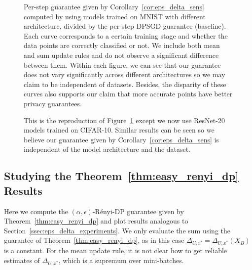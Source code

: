 \begin{figure}[t]
\centering
{}
\caption{Per-step guarantee given by Corollary~\ref{cor:eps_delta_sens} computed by using models trained on MNIST with different architecture, divided by the per-step DPSGD guarantee (baseline). Each curve corresponds to a certain training stage and whether the data points are correctly classified or not. We include both mean and sum update rules and do not observe a significant difference between them. Within each figure, we can see that our guarantee does not vary significantly across different architectures so we may claim to be independent of datasets. Besides, the disparity of these curves also supports our claim that more accurate points have better privacy guarantees.
}
\label{fig:ed_eps_curve_vary_arch_mnist}
\end{figure}


\begin{figure}[t]
\centering
{}
\caption{This is the reproduction of Figure~\ref{fig:ed_eps_curve_vary_arch_mnist} except we now use ResNet-20 models trained on CIFAR-10. Similar results can be seen so we believe our guarantee given by Corollary~\ref{cor:eps_delta_sens} is independent of the model architecture and the dataset. 
}
\label{fig:ed_eps_curve_vary_arch_cifar}
\end{figure}


\subsection{Studying the Theorem~\ref{thm:easy_renyi_dp} Results}
\label{ssec:eval_easy_renyi}

Here we compute the $(\alpha,\epsilon)$-R\'enyi-DP guarantee given by Theorem~\ref{thm:easy_renyi_dp} and plot results analogous to Section~\ref{ssec:eps_delta_experiments}. We only evaluate the sum using the guarantee of Theorem~\ref{thm:easy_renyi_dp}, as in this case $\Delta_{U,x^*} = \Delta_{U,x^*}(X_B)$ is a constant. For the mean update rule, it is not clear how to get reliable estimates of $\Delta_{U,x^*}$, which is a supremum over mini-batches.






